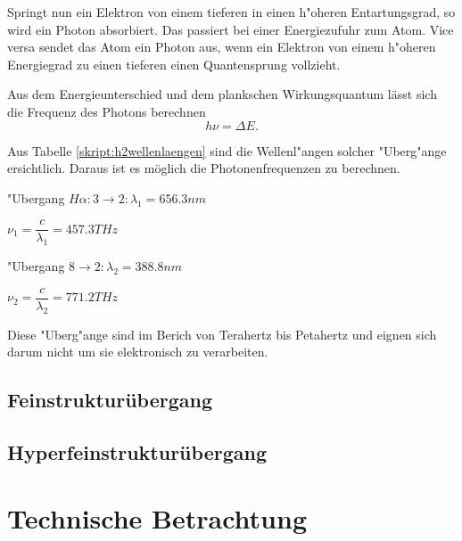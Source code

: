 \begin{refsection}
Springt nun ein Elektron von einem tieferen in einen h"oheren Entartungsgrad, so wird ein Photon absorbiert.
Das passiert bei einer Energiezufuhr zum Atom. 
Vice versa sendet das Atom ein Photon aus, wenn ein Elektron von einem h"oheren Energiegrad zu einen tieferen einen Quantensprung vollzieht.

Aus dem Energieunterschied und dem plankschen Wirkungsquantum lässt sich die Frequenz des Photons berechnen
\begin{equation}
	h\nu = \varDelta E.
\end{equation}

\vspace{.5cm}

Aus Tabelle \ref{skript:h2wellenlaengen} sind die Wellenl"angen solcher "Uberg"ange ersichtlich. Daraus ist es möglich die Photonenfrequenzen zu berechnen.

\begin{center}
	"Ubergang $H\alpha: 3 \rightarrow 2: \lambda_1 = 656.3nm$

$\nu_1 = \dfrac{c}{\lambda_1} = 457.3 THz $
\vspace{.5cm}

"Ubergang $8 \rightarrow 2: \lambda_2 = 388.8nm$

$\nu_2 = \dfrac{c}{\lambda_2} = 771.2 THz$
\end{center}	

Diese "Uberg"ange sind im Berich von Terahertz bis Petahertz und eignen sich darum nicht um sie elektronisch zu verarbeiten.






% 


\subsection{Feinstrukturübergang}
\subsection{Hyperfeinstrukturübergang}

\section{Technische Betrachtung}


\end{refsection}

